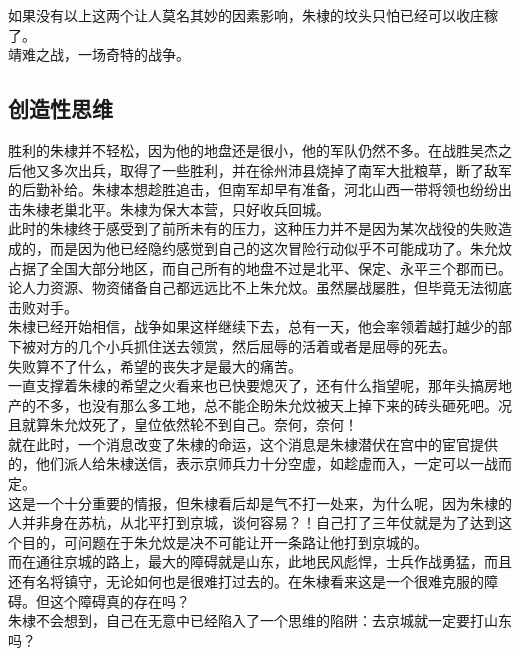 \begin{multicols}{\theparacolNo}
如果没有以上这两个让人莫名其妙的因素影响，朱棣的坟头只怕已经可以收庄稼了。\\

靖难之战，一场奇特的战争。\\

\subsection{创造性思维}
胜利的朱棣并不轻松，因为他的地盘还是很小，他的军队仍然不多。在战胜吴杰之后他又多次出兵，取得了一些胜利，并在徐州沛县烧掉了南军大批粮草，断了敌军的后勤补给。朱棣本想趁胜追击，但南军却早有准备，河北山西一带将领也纷纷出击朱棣老巢北平。朱棣为保大本营，只好收兵回城。\\

此时的朱棣终于感受到了前所未有的压力，这种压力并不是因为某次战役的失败造成的，而是因为他已经隐约感觉到自己的这次冒险行动似乎不可能成功了。朱允炆占据了全国大部分地区，而自己所有的地盘不过是北平、保定、永平三个郡而已。论人力资源、物资储备自己都远远比不上朱允炆。虽然屡战屡胜，但毕竟无法彻底击败对手。\\

朱棣已经开始相信，战争如果这样继续下去，总有一天，他会率领着越打越少的部下被对方的几个小兵抓住送去领赏，然后屈辱的活着或者是屈辱的死去。\\

失败算不了什么，希望的丧失才是最大的痛苦。\\

一直支撑着朱棣的希望之火看来也已快要熄灭了，还有什么指望呢，那年头搞房地产的不多，也没有那么多工地，总不能企盼朱允炆被天上掉下来的砖头砸死吧。况且就算朱允炆死了，皇位依然轮不到自己。奈何，奈何！\\

就在此时，一个消息改变了朱棣的命运，这个消息是朱棣潜伏在宫中的宦官提供的，他们派人给朱棣送信，表示京师兵力十分空虚，如趁虚而入，一定可以一战而定。\\

这是一个十分重要的情报，但朱棣看后却是气不打一处来，为什么呢，因为朱棣的人并非身在苏杭，从北平打到京城，谈何容易？！自己打了三年仗就是为了达到这个目的，可问题在于朱允炆是决不可能让开一条路让他打到京城的。\\

而在通往京城的路上，最大的障碍就是山东，此地民风彪悍，士兵作战勇猛，而且还有名将镇守，无论如何也是很难打过去的。在朱棣看来这是一个很难克服的障碍。但这个障碍真的存在吗？\\

朱棣不会想到，自己在无意中已经陷入了一个思维的陷阱：去京城就一定要打山东吗？\\


\end{multicols}
